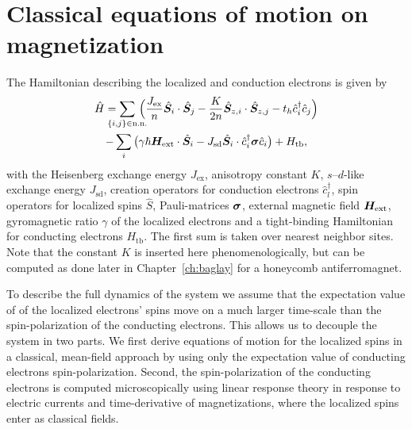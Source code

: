 \section{Classical equations of motion on magnetization}\label{cd:sd:motion}
The Hamiltonian describing the localized and conduction electrons is given by
\begin{multline}
    \hat{H}
        = \sum_{\mathclap{\{i,j\}\in\text{n.n.}}}\,\Big(\frac{J_{\text{ex}}}{n}\hat{\bb{S}}_i\cdot\hat{\bb{S}}_j - \frac{K}{2n}\hat{\bb{S}}_{z,i}\cdot\hat{\bb{S}}_{z,j}-t_h \hat{c}_i^\dagger\hat{c}_j
        \Big)\\-\sum_i \big(\gamma\hbar\bb{H}_\text{ext}\cdot\hat{\bb{S}}_i-J_\text{sd}\hat{\bb{S}}_i\cdot\hat{c}_i^\dagger\bb{\sigma}\hat{c}_i\big)+H_\text{tb},
    \label{intro:eq:Hm}%
\end{multline}
with the Heisenberg exchange energy $J_{\text{ex}}$, anisotropy constant $K$, $s$--$d$-like exchange energy $J_{\text{sd}}$, creation operators for conduction electrons $\hat{c}^\dagger_l$, spin operators for localized spins $\hat{S}$, Pauli-matrices $\boldsymbol{\sigma}$, external magnetic field $\boldsymbol{H}_\text{ext}$, gyromagnetic ratio $\gamma$ of the localized electrons and a tight-binding Hamiltonian for conducting electrons $H_\text{tb}$.  The first sum is taken over nearest neighbor sites. Note that the constant $K$ is inserted here phenomenologically, but can be computed as done later in Chapter~\ref{ch:baglay} for a honeycomb antiferromagnet.

To describe the full dynamics of the system we assume that the expectation value of of the localized electrons' spins move on a much larger time-scale than the spin-polarization of the conducting electrons. This allows us to decouple the system in two parts. We first derive equations of motion for the localized spins in a classical, mean-field approach by using only the expectation value of conducting electrons spin-polarization. Second, the spin-polarization of the conducting electrons is computed microscopically using linear response theory in response to electric currents and time-derivative of magnetizations, where the localized spins enter as classical fields. 

